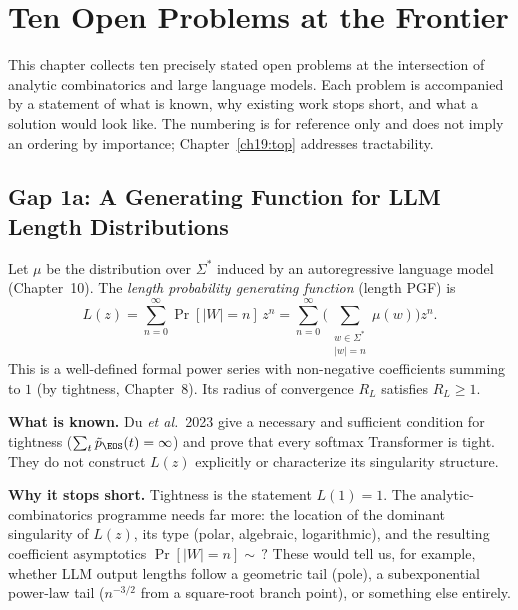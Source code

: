 \chapter{Ten Open Problems at the Frontier}
\label{ch18:top}

This chapter collects ten precisely stated open problems at the intersection of analytic combinatorics and large language models. Each problem is accompanied by a statement of what is known, why existing work stops short, and what a solution would look like. The numbering is for reference only and does not imply an ordering by importance; Chapter~\ref{ch19:top} addresses tractability.

\section{Gap 1a: A Generating Function for LLM Length Distributions}
\label{ch18:gap1a}

Let $\mu$ be the distribution over $\Sigma^*$ induced by an autoregressive language model (Chapter~10). The \emph{length probability generating function} (length PGF) is
$$
L(z)=\sum_{n=0}^{\infty}\Pr[|W|=n]\,z^n = \sum_{n=0}^{\infty}\biggl(\sum_{\substack{w\in\Sigma^* \\ |w|=n}}\mu(w)\biggr)z^n.
$$
This is a well-defined formal power series with non-negative coefficients summing to $1$ (by tightness, Chapter~8). Its radius of convergence $R_L$ satisfies $R_L\ge 1$.

\textbf{What is known.} Du \emph{et al.}\ 2023 \cite{DuEtAl2023} give a necessary and sufficient condition for tightness ($\sum_t\tilde p_{\EOS}(t)=\infty$) and prove that every softmax Transformer is tight. They do not construct $L(z)$ explicitly or characterize its singularity structure.

\textbf{Why it stops short.} Tightness is the statement $L(1)=1$. The analytic-combinatorics programme needs far more: the location of the dominant singularity of $L(z)$, its type (polar, algebraic, logarithmic), and the resulting coefficient asymptotics $\Pr[|W|=n]\sim\,?$ These would tell us, for example, whether LLM output lengths follow a geometric tail (pole), a subexponential power-law tail ($n^{-3/2}$ from a square-root branch point), or something else entirely.

